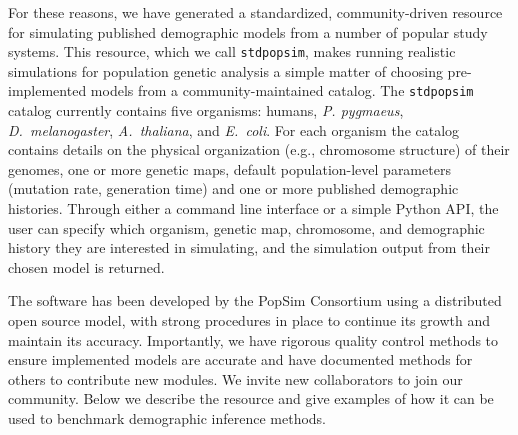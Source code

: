 \documentclass[12pt,halfline,a4paper]{ouparticle}
\newcommand{\stdpopsim}{\texttt{stdpopsim}\xspace}
\begin{document}

For these reasons, we have generated a standardized, community-driven resource
for simulating published demographic models from a number of popular study systems.
This resource, which we call \texttt{stdpopsim}, makes running
realistic simulations for population genetic analysis a simple matter of
choosing pre-implemented models from a community-maintained catalog.
The \stdpopsim catalog currently contains five organisms: humans, \emph{P. pygmaeus},
\emph{D.~melanogaster}, \emph{A.~thaliana}, and \emph{E.~coli}. For each
organism the catalog contains details on the physical organization (e.g., chromosome structure)
of their genomes, one or more genetic maps, default population-level parameters (mutation rate,
generation time) and one or more published demographic histories. Through
either a command line interface or a simple Python API, the user can specify which
organism, genetic map, chromosome, and demographic history they are interested in simulating, and the
simulation output from their chosen model is returned.

The software has been developed by the PopSim Consortium using a
distributed open source model, with strong procedures in place
to continue its growth and maintain its accuracy.
Importantly, we have rigorous quality control methods to ensure implemented models are accurate
and have documented methods for others to contribute new modules.
We invite new collaborators to join our community.
Below we describe the resource and give
examples of how it can be used to benchmark demographic inference methods.
\end{document}
